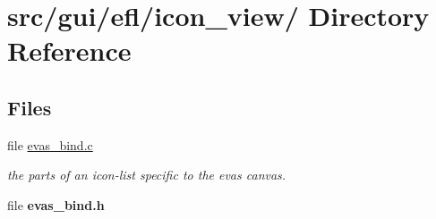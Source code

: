\hypertarget{dir_000019}{
\section{src/gui/efl/icon\_\-view/ Directory Reference}
\label{dir_000019}
}
\subsection*{Files}
\begin{CompactItemize}
\item 
file \hyperlink{evas__bind_8c}{evas\_\-bind.c}
\begin{CompactList}\small\item\em the parts of an icon-list specific to the evas canvas. \item\end{CompactList}

\item 
file {\bf evas\_\-bind.h}
\end{CompactItemize}
